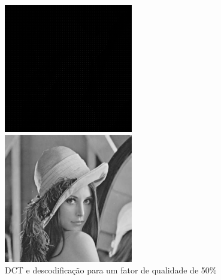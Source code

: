\documentclass[12pt,a4paper]{article}
\begin{document}
\begin{figure}[h]
	\centering
    \begin{minipage}{0.50\textwidth}
        \centering
        \includegraphics[width=0.5\textwidth]{imagens/ex7/DCT50.png}
    \end{minipage}\hfill
    \begin{minipage}{0.50\textwidth}
        \centering
        \includegraphics[width=0.5\textwidth]{imagens/ex7/IDCT50.png}
    \end{minipage}
    \caption{DCT e descodificação para um fator de qualidade de 50\%}
\end{figure}
\end{document}
